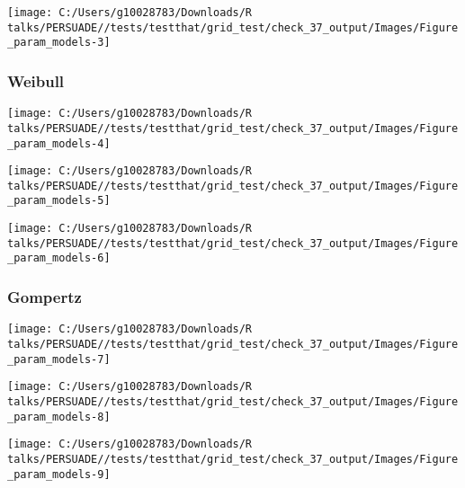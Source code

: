 \documentclass[
]{article}
\begin{document}
\begin{flushleft}\texttt{[image: C:/Users/g10028783/Downloads/R talks/PERSUADE//tests/testthat/grid\_test/check\_37\_output/Images/Figure\_param\_models-3]} \end{flushleft}

\clearpage

\subsubsection{Weibull}\label{weibull}

\begin{flushleft}\texttt{[image: C:/Users/g10028783/Downloads/R talks/PERSUADE//tests/testthat/grid\_test/check\_37\_output/Images/Figure\_param\_models-4]} \end{flushleft}

\begin{flushleft}\texttt{[image: C:/Users/g10028783/Downloads/R talks/PERSUADE//tests/testthat/grid\_test/check\_37\_output/Images/Figure\_param\_models-5]} \end{flushleft}

\begin{flushleft}\texttt{[image: C:/Users/g10028783/Downloads/R talks/PERSUADE//tests/testthat/grid\_test/check\_37\_output/Images/Figure\_param\_models-6]} \end{flushleft}

\clearpage

\subsubsection{Gompertz}\label{gompertz}

\begin{flushleft}\texttt{[image: C:/Users/g10028783/Downloads/R talks/PERSUADE//tests/testthat/grid\_test/check\_37\_output/Images/Figure\_param\_models-7]} \end{flushleft}

\begin{flushleft}\texttt{[image: C:/Users/g10028783/Downloads/R talks/PERSUADE//tests/testthat/grid\_test/check\_37\_output/Images/Figure\_param\_models-8]} \end{flushleft}

\begin{flushleft}\texttt{[image: C:/Users/g10028783/Downloads/R talks/PERSUADE//tests/testthat/grid\_test/check\_37\_output/Images/Figure\_param\_models-9]} \end{flushleft}
\end{document}
